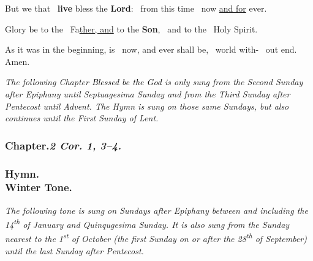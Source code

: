\documentclass[12pt]{article} %
\def\noinitial{%
\gresetfirstlineaboveinitial{\textcolor{benred8}{\small \textsc{\textbf{}}}}{\textcolor{benred8}{\small \textsc{\textbf{}}}}
\setspaceafterinitial{0pt plus 0em minus 0em}%
\setspacebeforeinitial{0pt plus 0em minus 0em}%
\relax %
}
\newenvironment{psalmtext}{\leftskip 0.25in}{\vspace{2 mm}}
\newenvironment{rubric}{\vspace{2 mm}\color{benred8} \itshape \leftskip 0in \setlength{\parindent}{0.25in}}{\vspace{2 mm}}
\def\pipe{\textcolor{benred8}{\textdoublepipe}}
\let\oldgresixstar\gresixstar
\renewcommand{\gresixstar}{\textcolor{benred8}{\oldgresixstar}}
\def\capitulumSpace{\hspace{20 mm}}
\begin{document}
\begin{pages}
\begin{Rightside}
\begin{psalmtext}
But we that \pipe\ \textbf{live} bless the \textbf{Lord}: \gresixstar\ from this time \pipe\ now \uline{and for} ever.

Glory be to the \pipe\ Fa\uline{ther, and} to the \textbf{Son}, \gresixstar\ and to the \pipe\ Holy Spirit.

As it was in the beginning, is \pipe\ now, and ever shall be, \gresixstar\ world with- \pipe\ out end. Amen.

\end{psalmtext}

\pend\pstart

{\noinitial
{}
}

\pend\pstart

\begin{rubric}
The following Chapter \emph{\textcolor{black}{Blessed be the God}} is only sung from the Second Sunday after Epiphany until Septuagesima Sunday and from the Third Sunday after Pentecost until Advent. The Hymn is sung on those same Sundays, but also continues until the First Sunday of Lent.

\end{rubric}

\pend\pstart


\subsubsection*{Chapter.\capitulumSpace \emph{2 Cor. 1, 3--4.}}

\label{DominicaCapitulum}

\pend\pstart


\pend\pstart


\subsubsection*{Hymn.\\Winter Tone.}

\pend\pstart

\begin{rubric}
The following tone is sung on Sundays after Epiphany between and including the 14\textsuperscript{th} of January and Quinqugesima Sunday. It is also sung from the Sunday nearest to the 1\textsuperscript{st} of October (the first Sunday on or after the 28\textsuperscript{th} of September) until the last Sunday after Pentecost.


\end{rubric}
\end{Rightside}
\end{pages}
\end{document}
